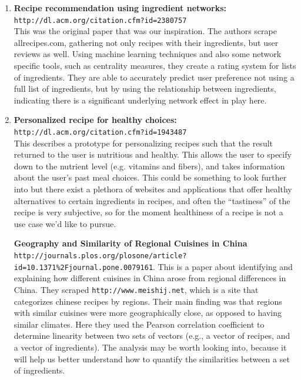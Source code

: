 \documentclass{article}
\begin{document}
\begin{enumerate}
    \item \textbf{Recipe recommendation using ingredient
        networks:} \texttt{http://dl.acm.org/citation.cfm?id=2380757} \\
        This was the original paper that was our inspiration. The authors
        scrape allrecipes.com, gathering not only recipes with their
        ingredients, but user reviews as well. Using machine learning
        techniques and also some network specific tools, such as centrality
        measures, they create a rating system for lists of ingredients.
        They are able to accurately predict user preference not using a
        full list of ingredients, but by using the relationship between
        ingredients, indicating there is a significant underlying network
        effect in play here.

    \item
    \textbf{Personalized recipe for healthy choices:} \texttt{http://dl.acm.org/citation.cfm?id=1943487} \\
    This describes a prototype for personalizing recipes such that the result returned to the user
    is nutritious and healthy. This allows the user to specify down to the nutrient level (e.g. vitamins and fibers),
    and takes information about the user's past meal choices. This could
    be something to look further into but there exist a plethora of
    websites and applications that offer healthy alternatives to
    certain ingredients in recipes, and often the ``tastiness'' of the
    recipe is very subjective, so for the moment healthiness of a recipe
    is not a use case we'd like to pursue.

    \textbf{Geography and Similarity of Regional Cuisines in China} \\
    \texttt{http://journals.plos.org/plosone/article?id=10.1371\%2Fjournal.pone.0079161}.
    This is a paper about identifying and explaining how different cuisines
    in China arose from regional differences in China. They scraped
    \texttt{http://www.meishij.net}, which is a site that categorizes
    chinese recipes by regions. Their main finding was that
    regions with similar cuisines were more geographically close,
    as opposed to having similar climates. Here they used the
    Pearson correlation coefficient to determine linearity
    between two sets of vectors (e.g., a vector of recipes,
    and a vector of ingredients). The analysis may be
    worth looking into, because it will help us better
    understand how to quantify the similarities between
    a set of ingredients.

\end{enumerate}
\end{document}
